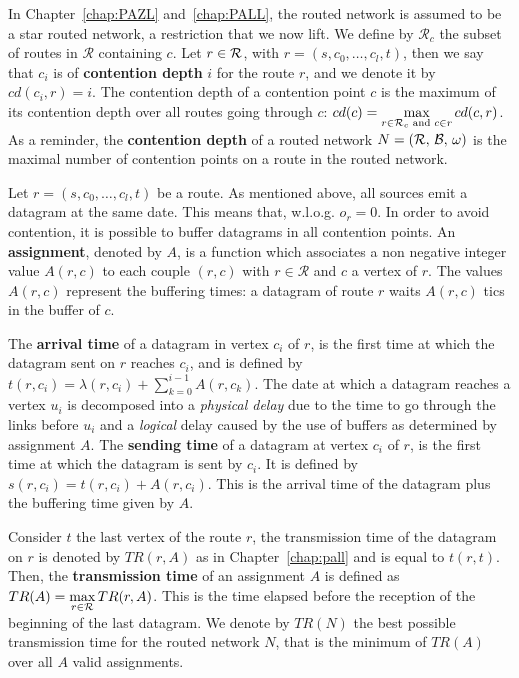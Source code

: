 In Chapter~\ref{chap:PAZL} and~\ref{chap:PALL}, the routed network is assumed to be a star routed network, a restriction that we now lift.
We define by $\mathcal{R}_c$ the subset of routes in $\mathcal{R}$ containing $c$. Let $r \in {\cal R}$, with $r = (s,c_0,\dots,c_l,t)$, then we say that $c_i$ is of \textbf{contention depth} $i$ for the route $r$, and we denote it by $cd(c_i,r) = i$. The contention depth of a contention point $c$ is the maximum of its contention depth over all routes going through $c$: $cd(c) = \max\limits_{r\in{\cal R}_c \text{ and } c \in r} cd(c,r)$. 
As a reminder, the \textbf{contention depth} of a routed network $N = ({\cal R},\,{\cal B},\,\omega)$ is the maximal number of contention points on a route in the routed network. 


   Let $r=(s,c_0,\dots,c_l,t)$ be a route. As mentioned above, all sources emit a datagram at the same date. This means that, w.l.o.g. $o_r = 0$. In order to avoid contention, it is possible to buffer datagrams in all contention points. An \textbf{assignment}, denoted by  $A$, is a function which associates a non negative integer value $A(r,c)$ to each couple $(r,c)$ with $r \in \mathcal{R}$ and $c$ a vertex of $r$. The values $A(r,c)$ represent the buffering times: a datagram of route $r$ waits $A(r,c)$ tics in the buffer of $c$.
          
       

 The \textbf{arrival time} of a datagram in vertex $c_i$ of $r$, is the first time at which the datagram sent on $r$ reaches $c_i$, and is defined by $t(r,c_i) = \lambda(r,c_i) + \sum_{k=0}^{i-1} A(r,c_k) $. The date at which a datagram reaches a vertex $u_i$ is decomposed into a \emph{physical delay} due to the time to go through the links before $u_i$ and a \emph{logical} delay caused by the use of buffers as determined by assignment $A$.
  The \textbf{sending time} of a datagram at vertex $c_i$ of $r$, is the first time at which the datagram is sent by $c_i$. It is defined by $s(r,c_i) = t(r,c_i) +  A(r,c_i) $. This is the arrival time of the datagram plus the buffering time given by $A$.
 
  Consider $t$ the last vertex of the route $r$, the transmission time of the datagram on 
  $r$ is denoted by $TR(r,A)$ as in Chapter~\ref{chap:pall} and is equal to $t(r,t)$. Then, the \textbf{transmission time} of an assignment $A$ is defined as $TR(A) = \displaystyle \max\limits_{r \in {\cal R}} TR(r,A) $. This is the time elapsed before the reception of the beginning of the last datagram. We denote by $TR(N)$ the best possible transmission time for the routed network $N$, that is the minimum of $TR(A)$ over all $A$ valid assignments.


